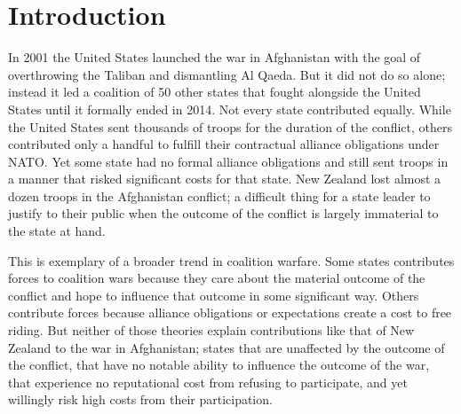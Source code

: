 \documentclass[12pt,letterpaper]{article}
\begin{document}
\section{Introduction}
	In 2001 the United States launched the war in Afghanistan with the goal of overthrowing the Taliban and dismantling Al Qaeda. But it did not do so alone; instead it led a coalition of 50 other states that fought alongside the United States until it formally ended in 2014. Not every state contributed equally. While the United States sent thousands of troops for the duration of the conflict, others contributed only a handful to fulfill their contractual alliance obligations under NATO. Yet some state had no formal alliance obligations and still sent troops in a manner that risked significant costs for that state. New Zealand lost almost a dozen troops in the Afghanistan conflict; a difficult thing for a state leader to justify to their public when the outcome of the conflict is largely immaterial to the state at hand.

	This is exemplary of a broader trend in coalition warfare. Some states contributes forces to coalition wars because they care about the material outcome of the conflict and hope to influence that outcome in some significant way. Others contribute forces because alliance obligations or expectations create a cost to free riding. But neither of those theories explain contributions like that of New Zealand to the war in Afghanistan; states that are unaffected by the outcome of the conflict, that have no notable ability to influence the outcome of the war, that experience no reputational cost from refusing to participate, and yet willingly risk high costs from their participation.
\end{document}
